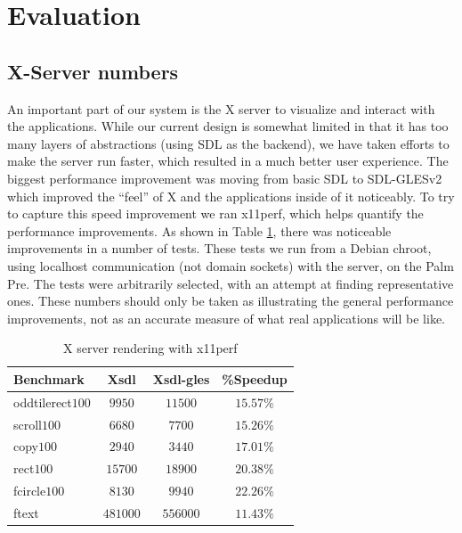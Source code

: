 \section{Evaluation}
\label{sec:eval}

\subsection{X-Server numbers}
\label{sec:x_eval}

An important part of our system is the X server to visualize and interact with the applications.  While our current design is somewhat limited in that it has too many layers of abstractions (using SDL as the backend), we have taken efforts to make the server run faster, which resulted in a much better user experience.  The biggest  performance improvement was moving from basic SDL to SDL-GLESv2 which improved the ``feel'' of X and the applications inside of it noticeably.  To try to capture this speed improvement we ran x11perf, which helps quantify the performance improvements.  As shown in Table \ref{tab:x_results}, there was noticeable improvements in a number of tests.
These tests we run from a Debian chroot, using localhost communication (not domain sockets) with the server, on the Palm Pre.  The tests were arbitrarily selected, with an attempt at finding representative ones.  These numbers should only be taken as illustrating the general performance improvements, not as an accurate measure of what real applications will be like.

\begin{table}[ht]
{\small
\hfill{}
\begin{tabular}{|l|c|c|c|}
\hline Benchmark & Xsdl & Xsdl-gles & \%Speedup \\ [2pt] 
\hline oddtilerect$100$ & $9950$ & $11500$ & $15.57\%$ \\ [2pt]
scroll$100$ & $6680$ & $7700$ & $15.26\%$ \\ [2pt]
copy$100$ & $2940$ & $3440$ & $17.01\%$ \\ [2pt]
rect$100$ & $15700$ & $18900$ & $20.38\%$ \\ [2pt]
fcircle$100$ & $8130$ & $9940$ & $22.26\%$ \\ [2pt]
ftext & $481000$ & $556000$ & $11.43\%$ \\ [2pt]
\hline 
\end{tabular}}
\hfill{}
\caption{ X server rendering with x11perf }
\label{tab:x_results}
\end{table}

